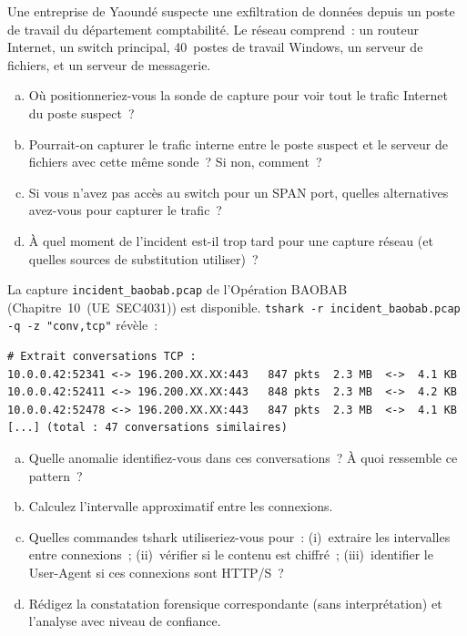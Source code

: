 \bigskip

\begin{boxexo}[title={\ding{45}\quad Exercice~15.1. Position de sonde \niveaubase}]
Une entreprise de Yaoundé suspecte une exfiltration de données depuis
un poste de travail du département comptabilité. Le réseau comprend~:
un routeur Internet, un switch principal, 40~postes de travail Windows,
un serveur de fichiers, et un serveur de messagerie.
\begin{enumerate}[(a)]
    \item Où positionneriez-vous la sonde de capture pour voir tout
          le trafic Internet du poste suspect~?
    \item Pourrait-on capturer le trafic interne entre le poste suspect
          et le serveur de fichiers avec cette même sonde~? Si non, comment~?
    \item Si vous n'avez pas accès au switch pour un SPAN port, quelles
          alternatives avez-vous pour capturer le trafic~?
    \item À quel moment de l'incident est-il trop tard pour une capture
          réseau (et quelles sources de substitution utiliser)~?
\end{enumerate}
\end{boxexo}

\begin{boxexo}[title={\ding{45}\quad Exercice~15.2. Analyse de capture \niveaumoyen}]
La capture \texttt{incident\_baobab.pcap} de l'Opération BAOBAB
(Chapitre~10~(UE~SEC4031)) est disponible. \texttt{tshark -r
incident\_baobab.pcap -q -z "conv,tcp"} révèle~:
\begin{lstlisting}[language=bash_forensique]
# Extrait conversations TCP :
10.0.0.42:52341 <-> 196.200.XX.XX:443   847 pkts  2.3 MB  <->  4.1 KB
10.0.0.42:52411 <-> 196.200.XX.XX:443   848 pkts  2.3 MB  <->  4.2 KB
10.0.0.42:52478 <-> 196.200.XX.XX:443   847 pkts  2.3 MB  <->  4.1 KB
[...] (total : 47 conversations similaires)
\end{lstlisting}
\begin{enumerate}[(a)]
    \item Quelle anomalie identifiez-vous dans ces conversations~?
          À quoi ressemble ce pattern~?
    \item Calculez l'intervalle approximatif entre les connexions.
    \item Quelles commandes tshark utiliseriez-vous pour~: (i)~extraire
          les intervalles entre connexions~; (ii)~vérifier si le
          contenu est chiffré~; (iii)~identifier le User-Agent si
          ces connexions sont HTTP/S~?
    \item Rédigez la constatation forensique correspondante (sans
          interprétation) et l'analyse avec niveau de confiance.
\end{enumerate}
\end{boxexo}

